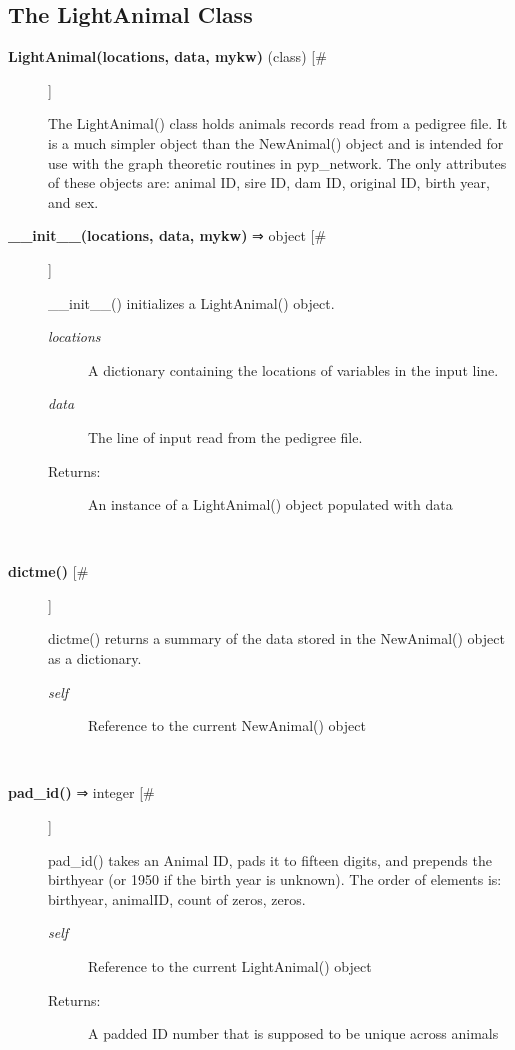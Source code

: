 \documentclass{article}
\begin{document}
\subsection*{The LightAnimal Class}
\begin{description}
\item[\textbf{LightAnimal(locations, data, mykw)} (class) [\#]
]
\par The LightAnimal() class holds animals records read from a pedigree file. It
is a much simpler object than the NewAnimal() object and is intended for use
with the graph theoretic routines in pyp\_network. The only attributes of these
objects are: animal ID, sire ID, dam ID, original ID, birth year, and sex.

\item[\textbf{\_\_init\_\_(locations, data, mykw)} ⇒ object [\#]
]
\par \_\_init\_\_() initializes a LightAnimal() object.
\begin{description}
\item[\textit{locations}
]
A dictionary containing the locations of variables in the input line.
\item[\textit{data}
]
The line of input read from the pedigree file.
\item[Returns:
]
An instance of a LightAnimal() object populated with data
\end{description}\\

\item[\textbf{dictme()} [\#]
]
\par dictme() returns a summary of the data stored in the NewAnimal() object
as a dictionary.
\begin{description}
\item[\textit{self}
]
Reference to the current NewAnimal() object
\end{description}\\

\item[\textbf{pad\_id()} ⇒ integer [\#]
]
\par pad\_id() takes an Animal ID, pads it to fifteen digits, and prepends the birthyear
(or 1950 if the birth year is unknown).  The order of elements is: birthyear, animalID,
count of zeros, zeros.
\begin{description}
\item[\textit{self}
]
Reference to the current LightAnimal() object
\item[Returns:
]
A padded ID number that is supposed to be unique across animals
\end{description}\\


\end{description}
\end{document}
